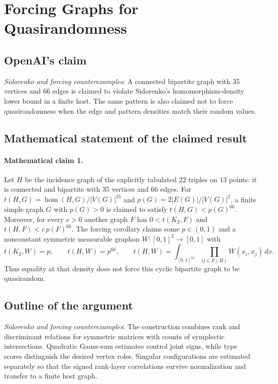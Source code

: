 \documentclass[11pt]{article}
\begin{document}
\section*{Forcing Graphs for Quasirandomness}

\subsection{OpenAI's claim}
\textit{Sidorenko and forcing counterexamples}: A connected bipartite graph with 35 vertices and 66 edges is claimed to violate Sidorenko’s homomorphism-density lower bound in a finite host. The same pattern is also claimed not to force quasirandomness when the edge and pattern densities match their random values.

\subsection{Mathematical statement of the claimed result}
\paragraph{Mathematical claim 1.} Let $H$ be the incidence graph of the explicitly tabulated $22$ triples on $13$ points: it is connected and bipartite with $35$ vertices and $66$ edges. For $t(H,G)=\operatorname{hom}(H,G)/|V(G)|^{35}$ and $p(G)=2|E(G)|/|V(G)|^2$, a finite simple graph $G$ with $p(G)>0$ is claimed to satisfy $t(H,G)<p(G)^{66}$. Moreover, for every $c>0$ another graph $F$ has $0<t(K_2,F)$ and $t(H,F)<c\,p(F)^{66}$. The forcing corollary claims some $p\in(0,1)$ and a nonconstant symmetric measurable graphon $W:[0,1]^2\to[0,1]$ with \[t(K_2,W)=p,\qquad t(H,W)=p^{66},\qquad t(H,W)=\int_{[0,1]^{35}}\prod_{ij\in E(H)}W(x_i,x_j)\,dx.\] Thus equality at that density does not force this cyclic bipartite graph to be quasirandom.

\subsection{Outline of the argument}
\textit{Sidorenko and forcing counterexamples}: The construction combines rank and discriminant relations for symmetric matrices with counts of symplectic intersections. Quadratic Gauss-sum estimates control joint signs, while type scores distinguish the desired vertex roles. Singular configurations are estimated separately so that the signed rank-layer correlations survive normalization and transfer to a finite host graph.
\end{document}
